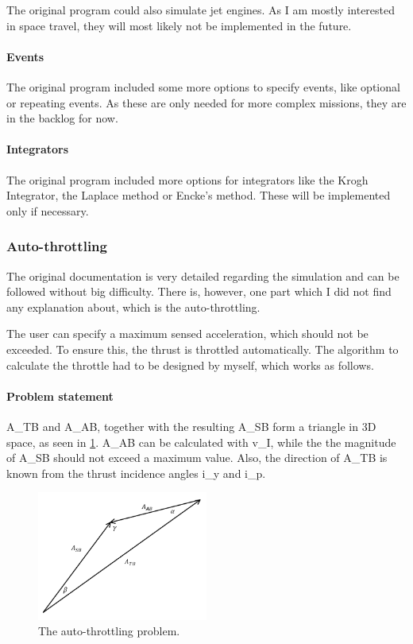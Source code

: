 The original program could also simulate jet engines. As I am mostly
interested in space travel, they will most likely not be implemented in the
future.

\paragraph{Events}

The original program included some more options to specify events, like
optional or repeating events. As these are only needed for more complex
missions, they are in the backlog for now.

\paragraph{Integrators}

The original program included more options for integrators like the Krogh
Integrator, the Laplace method or Encke's method. These will be implemented
only if necessary.

\subsubsection{Auto-throttling}\label{auto-throttling}

The original documentation is very detailed regarding the simulation and can
be followed without big difficulty. There is, however, one part which I did
not find any explanation about, which is the auto-throttling.

The user can specify a maximum sensed acceleration, which should not be
exceeded. To ensure this, the thrust is throttled automatically. The algorithm
to calculate the throttle had to be designed by myself, which works as
follows.

\paragraph{Problem statement}

\gls{A_TB} and \gls{A_AB}, together with the resulting \gls{A_SB} form a triangle in 3D space, as seen in \cref{auto-throttle}. \gls{A_AB} can be calculated with \gls{v_I}, while the the magnitude of \gls{A_SB} should not exceed a maximum value. Also, the direction of \gls{A_TB} is known from the thrust incidence angles \gls{i_y} and \gls{i_p}.

\begin{figure}[!ht]
  \centering
  \includegraphics[width=0.5\textwidth]{images/auto-throttle.png}
  \caption{The auto-throttling problem.}
  \label{auto-throttle}
\end{figure}

